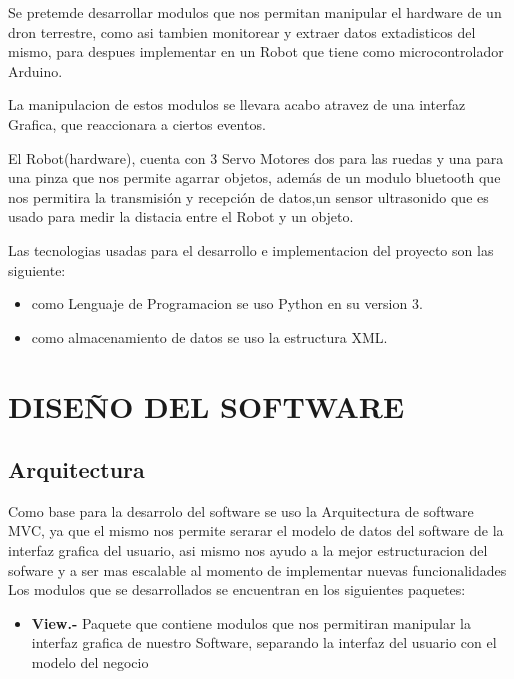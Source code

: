 \documentclass[letterpaper,12pt]{article}
\begin{document}
{Se pretemde desarrollar modulos que nos permitan manipular el hardware de un dron terrestre, como asi tambien monitorear y extraer datos extadisticos del  mismo, para despues implementar en un Robot que tiene como microcontrolador Arduino.

La manipulacion de estos modulos se llevara acabo atravez de una interfaz Grafica, que reaccionara a ciertos eventos.

El Robot(hardware), cuenta con 3 Servo Motores dos para las ruedas y una para una pinza que nos permite agarrar objetos, además de un modulo bluetooth que nos permitira la transmisión y recepción de datos,un sensor ultrasonido que es usado para medir la distacia entre el Robot y un objeto.

Las tecnologias usadas para el desarrollo e implementacion del proyecto son las siguiente:

\begin{itemize}
	\item como Lenguaje de Programacion se uso Python en su version 3.
	
	\item como almacenamiento de datos se uso la estructura XML.
		
\end{itemize}


\section{DISEÑO DEL SOFTWARE}


\subsection{Arquitectura}
	
	Como base para la desarrolo del software se uso la Arquitectura de software MVC, ya que el mismo nos permite serarar el modelo de datos del software de la interfaz grafica del usuario, asi mismo nos ayudo a la mejor estructuracion del sofware y a ser mas escalable al momento de implementar nuevas funcionalidades\\

Los modulos que se desarrollados se encuentran en los siguientes paquetes:
\begin{itemize}
	\item \textbf{View.- } Paquete que contiene modulos que nos permitiran manipular la interfaz grafica de nuestro Software, separando la interfaz del usuario con el modelo del negocio
	

\end{itemize}}
\end{document}
